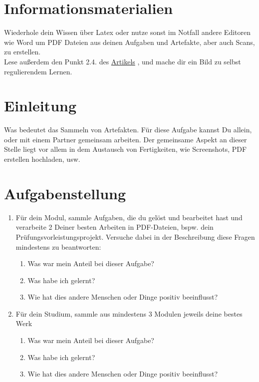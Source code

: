 \documentclass[a4paper,oneside]{scrarticle}
\begin{document}
	\pagebreak 
	
	\section*{Informationsmaterialien}
	
	Wiederhole dein Wissen über Latex oder nutze sonst im Notfall andere Editoren wie Word um PDF Dateien aus deinen Aufgaben und Artefakte, aber auch Scans, zu erstellen.\\
	Lese außerdem den Punkt 2.4. des \href{10.1016/j.sbspro.2010.03.463}{Artikels} \cite{alexiou_enhancing_2010}, und mache dir ein Bild zu selbst regulierendem Lernen.
	
	
	
	
	\pagebreak
	
	\section*{Einleitung}
	Was bedeutet das Sammeln von Artefakten. Für diese Aufgabe kannst Du allein, oder mit einem Partner gemeinsam arbeiten. Der gemeinsame Aspekt an dieser Stelle liegt vor allem in dem Austausch von Fertigkeiten, wie Screenshots, PDF erstellen hochladen, usw.
	
	\section*{Aufgabenstellung}

	\begin{enumerate}
		\item Für dein Modul, sammle Aufgaben, die du gelöst und bearbeitet hast und verarbeite 2 Deiner besten Arbeiten in PDF-Dateien, bspw. dein Prüfungsvorleistungsprojekt. Versuche dabei in der Beschreibung diese Fragen mindestens zu beantworten:
		\begin{enumerate}
			\item Was war mein Anteil bei dieser Aufgabe?
			\item Was habe ich gelernt?
			\item Wie hat dies andere Menschen oder Dinge positiv beeinflusst?
		\end{enumerate}
		\item Für dein Studium, sammle aus mindestens 3 Modulen jeweils deine bestes Werk
		\begin{enumerate}
			\item Was war mein Anteil bei dieser Aufgabe?
			\item Was habe ich gelernt?
			\item Wie hat dies andere Menschen oder Dinge positiv beeinflusst?
		\end{enumerate}

	\end{enumerate}
\end{document}

